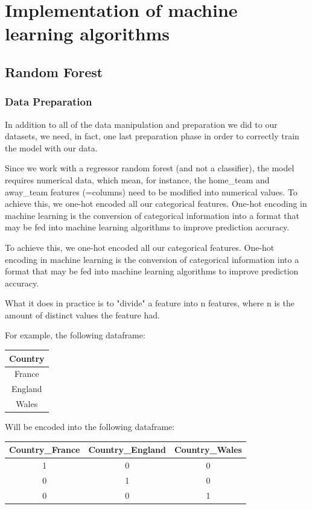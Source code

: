 \chapter{\fontsize{15}{12}\selectfont Implementation of machine learning algorithms}

\section{Random Forest}
\subsection{Data Preparation}
In addition to all of the data manipulation and preparation we did to our datasets, we need, in fact, one last preparation phase in order to correctly train the model with our data. 

Since we work with a regressor random forest (and not a classifier), the model requires numerical data, which mean, for instance, the home\_team and away\_team features (=columns) need to be modified into numerical values.
To achieve this, we one-hot encoded all our categorical features.
One-hot encoding in machine learning is the conversion of categorical information into a format that may be fed into machine learning algorithms to improve prediction accuracy.


To achieve this, we one-hot encoded all our categorical features.
One-hot encoding in machine learning is the conversion of categorical information into a format that may be fed into machine learning algorithms to improve prediction accuracy.

What it does in practice is to "divide" a feature into n features, where n is the amount of distinct values the feature had.

For example, the following dataframe:
\begin{table}[h]
  \centering
  \begin{tabular}{|c|}
    \hline
    Country\\
    \hline
    France
     \\
    \hline
    England\\
    \hline
    Wales\\
    \hline
  \end{tabular}
  \label{tab:exemple}
\end{table}


Will be encoded into the following dataframe:\\
\begin{table}[h]
  \centering
  \begin{tabular}{|c|c|c|}
    \hline
    Country\_France & Country\_England & Country\_Wales \\
    \hline
    1 & 0 & 0 \\
    \hline
    0 & 1 & 0 \\
    \hline
    0 & 0 & 1 \\
    \hline
  \end{tabular}
  \label{tab:exemple}
\end{table}

